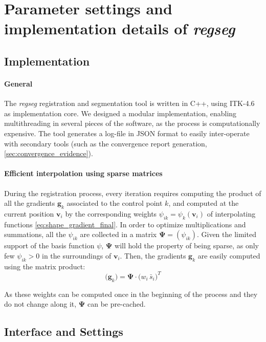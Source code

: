 \documentclass[a4paper]{report}
\renewcommand{\vec}[1]{\mathbf{#1}}
\begin{document}
\section{Parameter settings and implementation details of \emph{regseg}}

\subsection{Implementation}
\paragraph{General} The \emph{regseg} registration and segmentation tool is written in C++, using ITK-4.6 as
  implementation core.
We designed a modular implementation, enabling multithreading in several pieces of the software,
  as the process is computationally expensive.
The tool generates a log-file in JSON format to easily inter-operate with secondary tools (such
  as the convergence report generation, \autoref{sec:convergence_evidence}).

\paragraph{Efficient interpolation using sparse matrices}
During the registration process, every iteration requires computing the product of all the gradients
  $\vec{g}_k$ associated to the control point $k$, and computed at the current position
  $\vec{v}_i$ by the corresponding weights $\psi_{ik} = \psi_k(\mathbf{v}_i)$ of interpolating functions
  \eqref{eq:shape_gradient_final}.
In order to optimize multiplications and summations, all the $\psi_{ik}$ are collected in a
  matrix $\boldsymbol{\Psi} = (\psi_{ik})$.
Given the limited support of the basis function $\psi$, $\boldsymbol{\Psi}$ will hold the property
  of being sparse, as only few $\psi_{ik} > 0$ in the surroundings of $\vec{v}_i$.
Then, the gradients $\vec{g}_k$ are easily computed using the matrix product:
\begin{equation}
  \big(\vec{g}_k \big) = \boldsymbol{\Psi} \cdot \big( w_i \, \bar{s}_i \big)^T
  \label{eq:sparse_matrix}
\end{equation}

As these weights can be computed once in the beginning of the process and they do not change along
  it, $\boldsymbol{\Psi}$ can be pre-cached.

\subsection{Interface and Settings}\label{sec:interface_settings}
\end{document}
